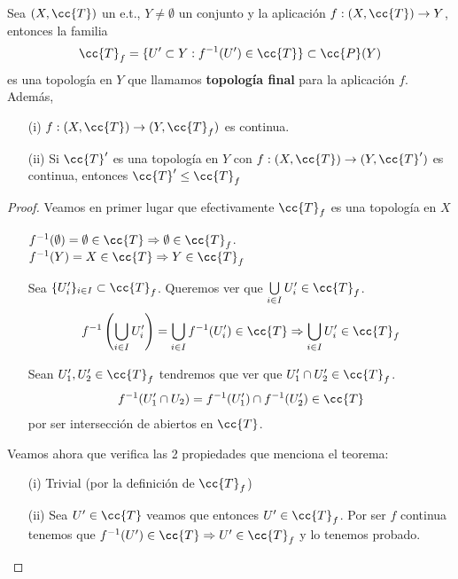 \begin{teo}
    Sea $(X, \cc{T})$ un e.t., $Y\neq \emptyset$ un conjunto y la aplicación $f:(X, \cc{T})\to Y$, entonces la familia
    \begin{gather*}
        \cc{T}_f = \{U'\subset Y : f^{-1}(U')\in \cc{T}\}\subset \cc{P}(Y)
    \end{gather*}
    es una topología en $Y$ que llamamos \textbf{topología final} para la aplicación $f$. Además,
    \begin{enumerate}
        \item[(i)] $f:(X, \cc{T})\to (Y, \cc{T}_f)$ es continua.
        \item[(ii)] Si $\cc{T}'$ es una topología en $Y$ con $f:(X, \cc{T})\to (Y, \cc{T}')$ es continua, entonces $\cc{T}'\leq \cc{T}_f$
    \end{enumerate}
    \begin{proof}
        Veamos en primer lugar que efectivamente $\cc{T}_f$ es una topología en $X$
        \begin{enumerate}
            \item[\apuntar{A1}] $f^{-1}(\emptyset)=\emptyset \in \cc{T} \Rightarrow \emptyset\in \cc{T}_f$. $f^{-1}(Y)=X\in \cc{T}\Rightarrow Y \in \cc{T}_f$
            \item[\apuntar{A2}] Sea $\{U_i'\}_{i\in I}\subset \cc{T}_f$. Queremos ver que $\bigcup\limits_{i\in I}U_i'\in \cc{T}_f$.
            \begin{gather*}
                f^{-1}\left(\bigcup\limits_{i\in I}U_i'\right) = \bigcup\limits_{i\in I} f^{-1}(U_i')\in \cc{T} \Rightarrow \bigcup\limits_{i\in I}U_i'\in \cc{T}_f
            \end{gather*}
            \item[\apuntar{A3}] Sean $U_1', U_2'\in \cc{T}_f$ tendremos que ver que $U_1'\cap U_2'\in \cc{T}_f$.
            \begin{gather*}
                f^{-1}(U_1'\cap U_2)=f^{-1}(U_1')\cap f^{-1}(U_2')\in \cc{T}
            \end{gather*}
            por ser intersección de abiertos en $\cc{T}$.
        \end{enumerate}
        Veamos ahora que verifica las 2 propiedades que menciona el teorema:
        \begin{enumerate}
            \item[(i)] Trivial (por la definición de $\cc{T}_f$)
            \item[(ii)] Sea $U'\in \cc{T}$ veamos que entonces $U'\in \cc{T}_f$. Por ser $f$ continua tenemos que $f^{-1}(U')\in \cc{T}\Rightarrow U'\in \cc{T}_f$ y lo tenemos probado.
        \end{enumerate}
    \end{proof}
\end{teo}


